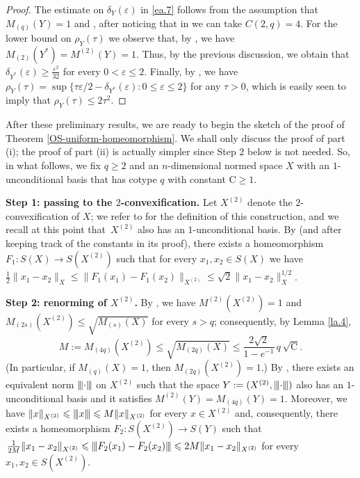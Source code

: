 \documentclass[11pt,leqno]{amsart}
\theoremstyle{remark}
\theoremstyle{plain}
\newcommand{\seminorm}[1]{{\left\vert\kern-0.25ex\left\vert\kern-0.25ex\left\vert #1
    \right\vert\kern-0.25ex\right\vert\kern-0.25ex\right\vert}}
\begin{document}
\begin{proof}
The estimate on $\delta_Y(\varepsilon)$ in \eqref{ea.7} follows from the assumption that $M_{(q)}(Y)=1$
and \cite[Theorem 1.f.1]{LT79}, after noticing that in \cite[Lemma 1.f.2]{LT79} we can take $C(2,q)=4$.
For the lower bound on $\rho_Y(\tau)$ we observe that, by \cite[Proposition 1.d.4]{LT79},
we have $M_{(2)}(Y^*)=M^{(2)}(Y)=1$. Thus, by the previous discussion, we obtain that
$\delta_{Y^*}(\varepsilon)\geqslant \frac{\varepsilon^2}{32}$ for every $0<\varepsilon \leqslant 2$.
Finally, by \cite[Proposition 1.e.2]{LT79}, we have
$\rho_Y(\tau)=\sup\{\tau\varepsilon/2-\delta_{Y^*}(\varepsilon)\colon 0\leqslant \varepsilon\leqslant 2\}$ for any $\tau>0$,
which is easily seen to imply that $\rho_Y(\tau) \leqslant 2\tau^2$.
\end{proof}
After these preliminary results, we are ready to begin the sketch of the proof of Theorem \ref{OS-uniform-homeomorphism}.
We shall only discuss the proof of part (i); the proof of part (ii) is actually simpler since Step 2 below is not needed.
So, in what follows, we fix $q\geqslant 2$ and an $n$-dimensional normed space $X$ with an $1$-unconditional basis that has
cotype $q$ with constant $\mathrm{C}\geqslant 1$.
\medskip

\noindent \textbf{Step 1: passing to the $2$-convexification.} Let $X^{(2)}$ denote the $2$-convexification of $X$; we refer to
\cite[page 53]{LT79} for the definition of this construction, and we recall at this point that~$X^{(2)}$ also has
an $1$-unconditional basis. By \cite[Proposition 9.3]{BL00} (and after keeping track of the constants in its proof),
there exists a homeomorphism $F_1\colon S(X)\to S(X^{(2)})$ such that for every $x_1,x_2\in S(X)$ we have
$\frac{1}{2}\|x_1-x_2\|_X\leqslant \|F_1(x_1)-F_1(x_2)\|_{X^{(2)}} \leqslant \sqrt{2} \|x_1-x_2\|_X^{1/2}$.
\medskip

\noindent \textbf{Step 2: renorming of $X^{(2)}$.} By \cite[pages 53 and 54]{LT79}, we have
$M^{(2)}(X^{(2)})=1$ and $M_{(2s)}(X^{(2)})\leqslant \sqrt{M_{(s)}(X)}$ for every $s>q$; consequently,
by Lemma \ref{la.4},
\[ M:=M_{(4q)}(X^{(2)})\leqslant \sqrt{M_{(2q)}(X)}\leqslant \frac{2\sqrt{2}}{1-e^{-1}}\, q\, \sqrt{\mathrm{C}}. \]
(In particular, if $M_{(q)}(X)=1$, then $M_{(2q)}(X^{(2)})=1$.)
By \cite[pages 184 and 185]{FJ74}, there exists an equivalent norm $\seminorm{\cdot}$ on $X^{(2)}$
such that the space $Y:=(X^{(2)},\seminorm{\cdot})$ also has an $1$-unconditional basis
and it satisfies $M^{(2)}(Y)=M_{(4q)}(Y)=1$. Moreover, we have
$\|x\|_{X^{(2)}} \leqslant \seminorm{x} \leqslant M \|x\|_{X^{(2)}}$ for every $x\in X^{(2)}$ and, consequently,
there exists a homeomorphism $F_2\colon S(X^{(2)})\to S(Y)$ such that
$\frac{1}{2M}\|x_1-x_2\|_{X^{(2)}} \leqslant \seminorm{F_2(x_1)-F_2(x_2)} \leqslant 2M \|x_1-x_2\|_{X^{(2)}}$
for every $x_1,x_2\in S(X^{(2)})$.
\medskip
\end{document}
